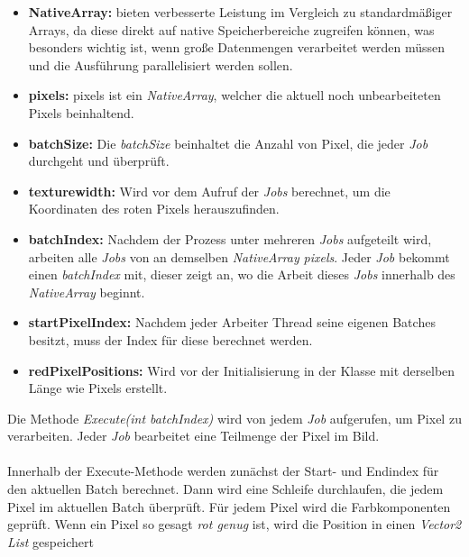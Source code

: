 \begin{itemize}
    \item \textbf{NativeArray:} bieten verbesserte Leistung im Vergleich zu standardmäßiger Arrays, da diese direkt auf native Speicherbereiche zugreifen können, was besonders wichtig ist, wenn große Datenmengen verarbeitet werden müssen und die Ausführung parallelisiert werden sollen.
    \item \textbf{pixels:} pixels ist ein \textit{NativeArray}, welcher die aktuell noch unbearbeiteten Pixels beinhaltend.
    \item \textbf{batchSize:} Die \textit{batchSize} beinhaltet die Anzahl von Pixel, die jeder \textit{Job} durchgeht und überprüft.
    \item \textbf{texturewidth:} Wird vor dem Aufruf der \textit{Jobs} berechnet, um die Koordinaten des roten Pixels herauszufinden.
    \item \textbf{batchIndex:} Nachdem der Prozess unter mehreren \textit{Jobs} aufgeteilt wird, arbeiten alle \textit{Jobs} von an demselben \textit{NativeArray} \textit{pixels}. Jeder \textit{Job} bekommt einen \textit{batchIndex} mit, dieser zeigt an, wo die Arbeit dieses \textit{Jobs} innerhalb des \textit{NativeArray} beginnt.
    \item \textbf{startPixelIndex:} Nachdem jeder Arbeiter Thread seine eigenen Batches besitzt, muss der Index für diese berechnet werden.
    \item \textbf{redPixelPositions:} Wird vor der Initialisierung in der Klasse mit derselben Länge wie Pixels erstellt.
\end{itemize}
Die Methode \textit{Execute(int batchIndex)} wird von jedem \textit{Job} aufgerufen, um Pixel zu verarbeiten. Jeder \textit{Job} bearbeitet eine Teilmenge der Pixel im Bild.\\
\\
Innerhalb der Execute-Methode werden zunächst der Start- und Endindex für den aktuellen Batch berechnet. Dann wird eine Schleife durchlaufen, die jedem Pixel im aktuellen Batch überprüft. Für jedem Pixel wird die Farbkomponenten geprüft. Wenn ein Pixel so gesagt \textit{rot genug} ist, wird die Position in einen \textit{Vector2 List} gespeichert
